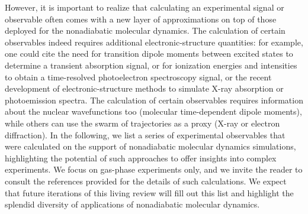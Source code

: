 \documentclass[9pt,bestpractices]{livecoms}
\begin{document}
However, it is important to realize that calculating an experimental signal or observable often comes with a new layer of approximations on top of those deployed for the nonadiabatic molecular dynamics. The calculation of certain observables indeed requires additional electronic-structure quantities: for example, one could cite the need for transition dipole moments between excited states to determine a transient absorption signal, or for ionization energies and intensities to obtain a time-resolved photoelectron spectroscopy signal, or the recent development of electronic-structure methods to simulate X-ray absorption or photoemission spectra.\cite{vidal2020equation,seidu2019simulation,leyser2024general} The calculation of certain observables requires information about the nuclear wavefunctions too (molecular time-dependent dipole moments), while others can use the swarm of trajectories as a proxy (X-ray or electron diffraction). 
In the following, we list a series of experimental observables that were calculated on the support of nonadiabatic molecular dynamics simulations, highlighting the potential of such approaches to offer insights into complex experiments. We focus on gas-phase experiments only, and we invite the reader to consult the references provided for the details of such calculations. We expect that future iterations of this living review will fill out this list and highlight the splendid diversity of applications of nonadiabatic molecular dynamics.
\end{document}
